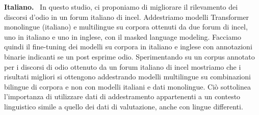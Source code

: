 \documentclass[11pt]{article}
\newcommand{\todoA}[1]{\todo[color=blue!40]{A: #1}}
\begin{document}
\begin{abstract-alt}
\textrm{\bf{Italiano.}}~
In questo studio, ci proponiamo di migliorare il rilevamento dei discorsi d'odio in un forum italiano di incel.
Addestriamo modelli Transformer monolingue (italiano) e multilingue su corpora ottenuti da due forum di incel, uno in italiano e uno in inglese, con il masked language modeling. Facciamo quindi il fine-tuning dei modelli su corpora in italiano e inglese con annotazioni binarie indicanti se un post esprime odio.
Sperimentando su un corpus annotato per i discorsi di odio ottenuto da un forum italiano di incel mostriamo che i risultati migliori si ottengono addestrando modelli multilingue su combinazioni bilingue di corpora e non con modelli italiani e dati monolingue. Ciò sottolinea l'importanza di utilizzare dati di addestramento appartenenti a un contesto linguistico simile a quello dei dati di valutazione, anche con lingue differenti.

\end{abstract-alt}
\end{document}
